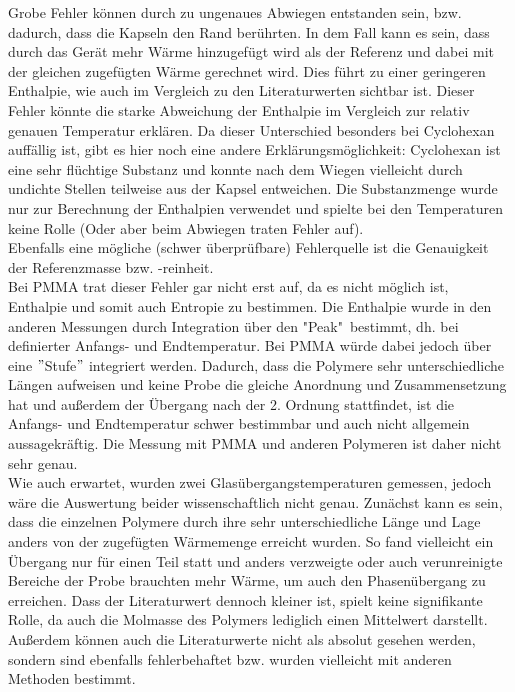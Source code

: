 \documentclass[12pt,a4paper,titlepage,headinclude,bibtotoc]{scrartcl}
\begin{document}
Grobe Fehler können durch zu ungenaues Abwiegen entstanden sein, bzw. dadurch, dass die Kapseln den Rand berührten. In dem Fall kann es sein, dass durch das Gerät mehr Wärme hinzugefügt wird als der Referenz und dabei mit der gleichen zugefügten Wärme gerechnet wird. Dies führt zu einer geringeren Enthalpie, wie auch im Vergleich zu den Literaturwerten sichtbar ist. Dieser Fehler könnte die starke Abweichung der Enthalpie im Vergleich zur relativ genauen Temperatur erklären. Da dieser Unterschied besonders bei Cyclohexan auffällig ist, gibt es hier noch eine andere Erklärungsmöglichkeit:
Cyclohexan ist eine sehr flüchtige Substanz und konnte nach dem Wiegen vielleicht durch undichte Stellen teilweise aus der Kapsel entweichen. Die Substanzmenge wurde nur zur Berechnung der Enthalpien verwendet und spielte bei den Temperaturen keine Rolle (Oder aber beim Abwiegen traten Fehler auf). \\
 Ebenfalls eine mögliche (schwer überprüfbare) Fehlerquelle ist die Genauigkeit der Referenzmasse bzw. -reinheit.\\

Bei PMMA trat dieser Fehler gar nicht erst auf, da es nicht möglich ist, Enthalpie und somit auch Entropie zu bestimmen. Die Enthalpie wurde in den anderen Messungen durch Integration über den "Peak"\, bestimmt, dh. bei definierter Anfangs- und Endtemperatur. Bei PMMA würde dabei jedoch über eine $"$Stufe$"$ integriert werden. Dadurch, dass die Polymere sehr unterschiedliche Längen aufweisen und keine Probe die gleiche Anordnung und Zusammensetzung hat und außerdem der Übergang nach der 2. Ordnung stattfindet, ist die Anfangs- und Endtemperatur schwer bestimmbar und auch nicht allgemein aussagekräftig. Die Messung mit PMMA und anderen Polymeren ist daher nicht sehr genau. \\
Wie auch erwartet, wurden zwei Glasübergangstemperaturen gemessen, jedoch wäre die Auswertung beider wissenschaftlich nicht genau. Zunächst kann es sein, dass die einzelnen Polymere durch ihre sehr unterschiedliche Länge und Lage anders von der zugefügten Wärmemenge erreicht wurden. So fand vielleicht ein Übergang nur für einen Teil statt und anders verzweigte oder auch verunreinigte Bereiche der Probe brauchten mehr Wärme, um auch den Phasenübergang zu erreichen. Dass der Literaturwert dennoch kleiner ist, spielt keine signifikante Rolle, da auch die Molmasse des Polymers lediglich einen Mittelwert darstellt. Außerdem können auch die Literaturwerte nicht als absolut gesehen werden, sondern sind ebenfalls fehlerbehaftet bzw. wurden vielleicht mit anderen Methoden bestimmt.\\ 
\end{document}
